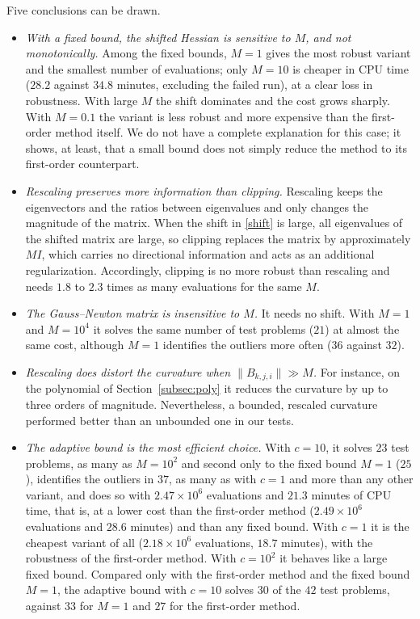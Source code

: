 \documentclass[11pt]{article}
\begin{document}
Five conclusions can be drawn.
\begin{itemize}
\item \emph{With a fixed bound, the shifted Hessian is sensitive to $M$, and not
monotonically.} Among the fixed bounds, $M = 1$ gives the most robust variant
and the smallest number of evaluations; only $M = 10$ is cheaper in CPU time
($28.2$ against $34.8$ minutes, excluding the failed run), at a clear loss in
robustness. With large $M$ the shift dominates and the cost grows sharply.
With $M = 0.1$ the variant is less robust and more expensive than the
first-order method itself. We do not have a complete explanation for this
case; it shows, at least, that a small bound does not simply reduce the method
to its first-order counterpart.
\item \emph{Rescaling preserves more information than clipping.} Rescaling
keeps the eigenvectors and the ratios between eigenvalues and only changes the
magnitude of the matrix. When the shift in \eqref{shift} is large, all
eigenvalues of the shifted matrix are large, so clipping replaces the matrix by
approximately $M I$, which carries no directional information and acts as an
additional regularization. Accordingly, clipping is no more robust than
rescaling and needs $1.8$ to $2.3$ times as many evaluations for the same $M$.
\item \emph{The Gauss--Newton matrix is insensitive to $M$.} It needs no
shift. With $M = 1$ and $M = 10^4$ it solves the same number of test problems
($21$) at almost the same cost, although $M = 1$ identifies the outliers more
often ($36$ against $32$).
\item \emph{Rescaling does distort the curvature when $\|B_{k,j,i}\| \gg M$.}
For instance, on the polynomial of Section~\ref{subsec:poly} it reduces the
curvature by up to three orders of magnitude. Nevertheless, a bounded,
rescaled curvature performed better than an unbounded one in our tests.
\item \emph{The adaptive bound is the most efficient choice.} With $c = 10$, it
solves $23$ test problems, as many as $M = 10^2$ and second only to the fixed
bound $M = 1$ ($25$),
identifies the outliers in $37$, as many as with $c = 1$ and more than any
other variant, and does so with
$2.47 \times 10^6$ evaluations and $21.3$ minutes of CPU time, that is, at a
lower cost than the first-order method ($2.49 \times 10^6$ evaluations and
$28.6$ minutes) and than any fixed bound. With $c = 1$ it is the cheapest
variant of all ($2.18 \times 10^6$ evaluations, $18.7$ minutes), with the
robustness of the first-order method. With $c = 10^2$ it behaves like a large
fixed bound. Compared only with the first-order method and the fixed bound
$M = 1$, the adaptive bound with $c = 10$ solves $30$ of the $42$ test
problems, against $33$ for $M = 1$ and $27$ for the first-order method.
\end{itemize}
\end{document}
